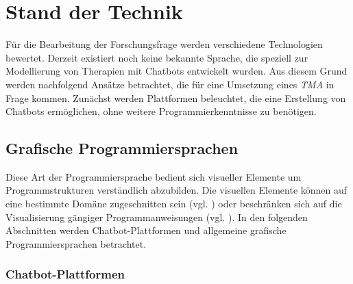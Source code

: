 
\section{Stand der Technik}
\label{ch:Forschungsstand}
Für die Bearbeitung der Forschungsfrage werden verschiedene Technologien bewertet.  Derzeit existiert noch keine bekannte Sprache, die speziell zur Modellierung von Therapien mit Chatbots entwickelt wurden. Aus diesem Grund werden nachfolgend Ansätze betrachtet, die für eine Umsetzung eines \emph{TMA} in Frage kommen. Zunächst werden Plattformen beleuchtet, die eine Erstellung von Chatbots ermöglichen, ohne weitere Programmierkenntnisse zu benötigen. 

\subsection{Grafische Programmiersprachen}
Diese Art der Programmiersprache bedient sich visueller Elemente um Programmstrukturen verständlich abzubilden. Die visuellen Elemente können auf eine bestimmte Domäne zugeschnitten sein (vgl. \cite{WasistLa94:online}) oder beschränken sich auf die Visualisierung gängiger Programmanweisungen (vgl. \cite{BlocklyG57:online}). In den folgenden Abschnitten werden Chatbot-Plattformen und allgemeine grafische Programmiersprachen betrachtet.

\subsubsection{Chatbot-Plattformen}

